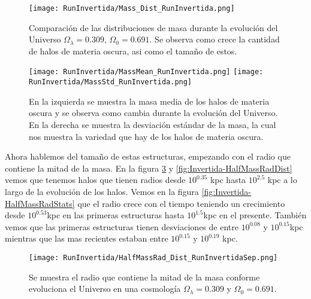 \begin{figure}[H]
    \centering
    \texttt{[image: RunInvertida/Mass\_Dist\_RunInvertida.png]}
    \caption[Comparación de distribución de masa Universo $\Omega_\lambda = 0.309 $, $\Omega_0 = 0.691$]{\footnotesize Comparación de las distribuciones de masa durante la evolución del Universo $\Omega_\lambda = 0.309 $, $\Omega_0 = 0.691$. Se observa como crece la cantidad de halos de materia oscura, asi como el tamaño de estos.}
    \label{fig:Invertida-MassDist}
\end{figure}

\begin{figure}[H]
    \centering
    \texttt{[image: RunInvertida/MassMean\_RunInvertida.png]}
    \texttt{[image: RunInvertida/MassStd\_RunInvertida.png]}
    \caption[Media y desviación estándar de la distribución de masa de un Universo $\Omega_\lambda = 0.309 $, $\Omega_0 = 0.691$]{\footnotesize En la izquierda se muestra la masa media de los halos de materia oscura y se observa como cambia durante la evolución del Universo. En la derecha se muestra la desviación estándar de la masa, la cual nos muestra la variedad que hay de los halos de materia oscura.}
    \label{fig:Invertida-MassStats}
\end{figure}

Ahora hablemos del tamaño de estas estructuras, empezando con el radio que contiene la mitad de la masa. En la figura \ref{fig:Invertida-HalfMassRadDistSep} y \ref{fig:Invertida-HalfMassRadDist} vemos que tenemos halos que tienen radios desde $10^{0.35}$ kpc hasta $10^{2.5}$ kpc a lo largo de la evolución de los halos. Vemos en la figura \ref{fig:Invertida-HalfMassRadStats} que el radio crece con el tiempo teniendo un crecimiento desde $10^{0.53}$kpc en las primeras estructuras hasta $10^{1.5}$kpc en el presente. También vemos que las primeras estructuras tienen desviaciones de entre $10^{0.08}$ y $10^{0.15}$kpc mientras que las mas recientes estaban entre $10^{0.15}$ y $10^{0.19}$ kpc.

\begin{figure}[H]
    \centering
    \texttt{[image: RunInvertida/HalfMassRad\_Dist\_RunInvertidaSep.png]}
    \caption[Radio que contiene la mitad de la masa en la evolución de un Universo $\Omega_\lambda = 0.309 $, $\Omega_0 = 0.691$]{\footnotesize Se muestra el radio que contiene la mitad de la masa conforme evoluciona el Universo en una cosmología $\Omega_\lambda = 0.309 $ y $\Omega_0 = 0.691$.}
    \label{fig:Invertida-HalfMassRadDistSep}
\end{figure}

